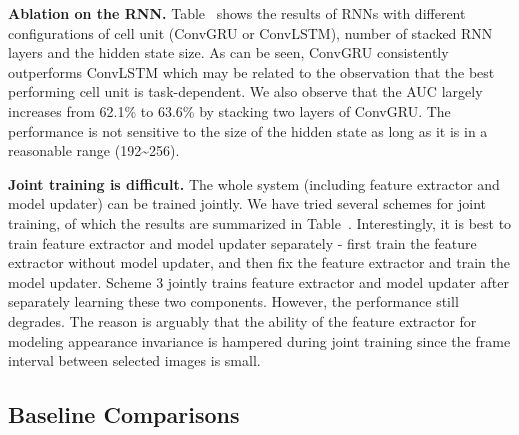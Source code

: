 \documentclass[journal]{IEEEtran}
\begin{document}
\textbf{Ablation on the RNN.} Table~ shows the results of RNNs with different configurations of cell unit (ConvGRU or ConvLSTM), number of stacked RNN layers and the hidden state size. As can be seen, ConvGRU consistently outperforms ConvLSTM which may be related to the observation that the best performing cell unit is task-dependent\cite{chung2014empirical}. We also observe that the AUC largely increases from 62.1\% to 63.6\% by stacking two layers of ConvGRU. The performance is not sensitive to the size of the hidden state as long as it is in a reasonable range (192\textasciitilde256).

\textbf{Joint training is difficult.} The whole system (including feature extractor and model updater) can be trained jointly. We have tried several schemes for joint training, of which the results are summarized in Table~. Interestingly, it is best to train feature extractor and model updater separately - first train the feature extractor without model updater, and then fix the feature extractor and train the model updater. Scheme 3 jointly trains feature extractor and model updater after separately learning these two components. However, the performance still degrades. The reason is arguably that the ability of the feature extractor for modeling appearance invariance is hampered during joint training since the frame interval between selected images is small.

\subsection{Baseline Comparisons} \label{sec:compare-with-baselines}
\end{document}
